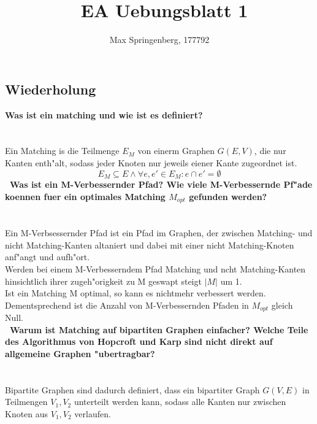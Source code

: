 \documentclass{article}
\author{Max Springenberg, 177792}
\title{\
    EA Uebungsblatt 1
    }
\date{}
\newcommand{\gap}{\null\ \\ \\}
\newcommand{\task}[1]{\textbf{#1} \\ \gap}
\begin{document}
\maketitle
\newpage
\subsection{Wiederholung}
\task{Was ist ein matching und wie ist es definiert?}
Ein Matching is die Teilmenge $E_M$ von einerm Graphen $G(E,V)$, die nur Kanten
    enth"alt, sodass jeder Knoten nur jeweils eiener Kante zugeordnet ist.\[
        E_M \subseteq E \land \forall e, e' \in E_M : e \cap e' = \emptyset
    \]
\task{\
    Was ist ein M-Verbessernder Pfad? Wie viele M-Verbessernde Pf"ade koennen
        fuer ein optimales Matching $M_{opt}$ gefunden werden?
    }
Ein M-Verbsessernder Pfad ist ein Pfad im Graphen, der zwischen Matching- und 
    nicht Matching-Kanten altaniert und dabei mit einer nicht Matching-Knoten
    anf"angt und aufh"ort.\\
Werden bei einem M-Verbesserndem Pfad Matching und ncht Matching-Kanten
    hinsichtlich ihrer zugeh"origkeit zu M geswapt steigt $|M|$ um 1.\\
Ist ein Matching M optimal, so kann es nichtmehr verbessert werden.
    Dementsprechend ist die Anzahl von M-Verbessernden Pfaden in $M_{opt}$
    gleich Null.\\
\task{\
    Warum ist Matching auf bipartiten Graphen einfacher? Welche Teile des
        Algorithmus von Hopcroft und Karp sind nicht direkt auf allgemeine
        Graphen "ubertragbar?
    }
Bipartite Graphen sind dadurch definiert, dass ein bipartiter Graph $G(V,E)$
    in Teilmengen $V_1, V_2$ unterteilt werden kann, sodass alle Kanten nur
    zwischen Knoten aus $V_1, V_2$ verlaufen.\\
\end{document}

